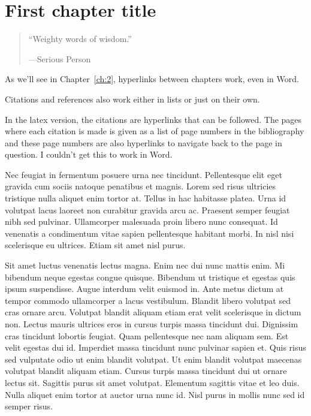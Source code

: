 
\chapter{First chapter title} \label{ch:1}

\begin{quote}
``Weighty words of wisdom.''
\begin{flushright}---Serious Person \end{flushright}
\end{quote}

As we'll see in Chapter~\ref{ch:2}, hyperlinks between chapters work, even in Word.

Citations and references also work either in lists\cite{Atzeni,fouquet2006seven,langmuir1928oscillations} or just on their own.\cite{MetropolisHastings}

In the latex version, the citations are hyperlinks that can be followed. The pages where each citation is made is given as a list of page numbers in the bibliography and these page numbers are also hyperlinks to navigate back to the page in question. I couldn't get this to work in Word.

Nec feugiat in fermentum posuere urna nec tincidunt. Pellentesque elit eget gravida cum sociis natoque penatibus et magnis. Lorem sed risus ultricies tristique nulla aliquet enim tortor at. Tellus in hac habitasse platea. Urna id volutpat lacus laoreet non curabitur gravida arcu ac. Praesent semper feugiat nibh sed pulvinar. Ullamcorper malesuada proin libero nunc consequat. Id venenatis a condimentum vitae sapien pellentesque habitant morbi. In nisl nisi scelerisque eu ultrices. Etiam sit amet nisl purus.

Sit amet luctus venenatis lectus magna. Enim nec dui nunc mattis enim. Mi bibendum neque egestas congue quisque. Bibendum ut tristique et egestas quis ipsum suspendisse. Augue interdum velit euismod in. Ante metus dictum at tempor commodo ullamcorper a lacus vestibulum. Blandit libero volutpat sed cras ornare arcu. Volutpat blandit aliquam etiam erat velit scelerisque in dictum non. Lectus mauris ultrices eros in cursus turpis massa tincidunt dui. Dignissim cras tincidunt lobortis feugiat. Quam pellentesque nec nam aliquam sem. Est velit egestas dui id. Imperdiet massa tincidunt nunc pulvinar sapien et. Quis risus sed vulputate odio ut enim blandit volutpat. Ut enim blandit volutpat maecenas volutpat blandit aliquam etiam. Cursus turpis massa tincidunt dui ut ornare lectus sit. Sagittis purus sit amet volutpat. Elementum sagittis vitae et leo duis. Nulla aliquet enim tortor at auctor urna nunc id. Nisl purus in mollis nunc sed id semper risus.

